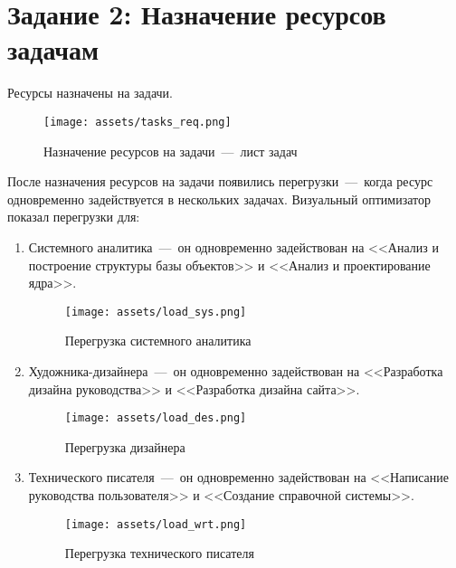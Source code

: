 \newpage

\section{Задание 2: Назначение ресурсов задачам}

Ресурсы назначены на задачи. 

\begin{figure}[H]
    \begin{center}
    \texttt{[image: assets/tasks\_req.png]}
    \caption{Назначение ресурсов на задачи~---~лист задач}
    \label{fig:2}
    \end{center}
\end{figure}

После назначения ресурсов на задачи появились перегрузки~---~когда ресурс одновременно задействуется в нескольких задачах. Визуальный оптимизатор показал перегрузки для: 

\begin{enumerate}

\item Системного аналитика~---~он одновременно задействован на <<Анализ и построение структуры базы объектов>> и <<Анализ и проектирование ядра>>.

\begin{figure}[H]
    \begin{center}
    \texttt{[image: assets/load\_sys.png]}
    \caption{Перегрузка системного аналитика}
    \label{fig:2}
    \end{center}
\end{figure}

\item Художника-дизайнера~---~он одновременно задействован на <<Разработка дизайна руководства>> и <<Разработка дизайна сайта>>.

\begin{figure}[H]
    \begin{center}
    \texttt{[image: assets/load\_des.png]}
    \caption{Перегрузка дизайнера}
    \label{fig:2}
    \end{center}
\end{figure}

\item Технического писателя~---~он одновременно задействован на <<Написание руководства пользователя>> и <<Создание справочной системы>>.

\begin{figure}[H]
    \begin{center}
    \texttt{[image: assets/load\_wrt.png]}
    \caption{Перегрузка технического писателя}
    \label{fig:2}
    \end{center}
\end{figure}

\end{enumerate}


